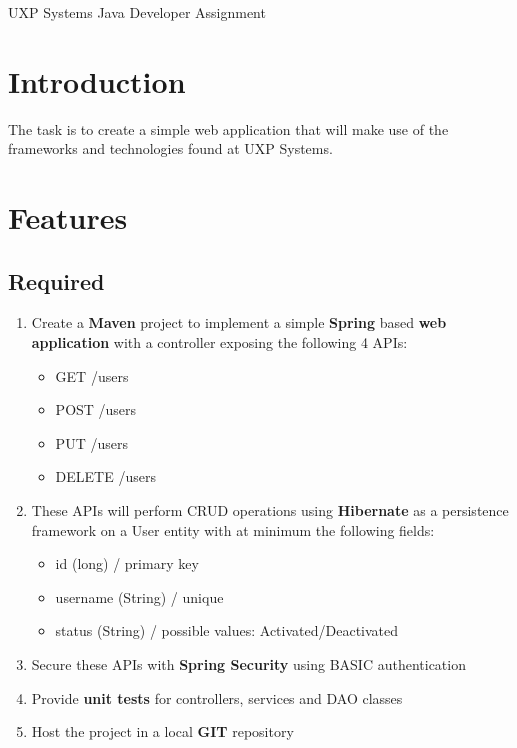 \documentclass[12pt, onecolumn]{article}
\begin{document}
\vspace*{-75px}
\begingroup  
\centering
\LARGE UXP Systems Java Developer Assignment\\[1.5em]
\endgroup
\section{Introduction}
The task is to create a simple web application that will make use of the frameworks and technologies found at UXP Systems.

\section{Features}
\subsection{Required}
\begin{enumerate}
\item Create a \textbf{Maven} project to implement a simple \textbf{Spring} based \textbf{web application} with a controller exposing the following 4 APIs:
\begin{itemize}
	\item GET  /users
	\item POST /users
	\item PUT /users
	\item DELETE /users
\end{itemize}
\item These APIs will perform CRUD operations using \textbf{Hibernate} as a persistence framework on a User entity with at minimum the following fields:
\begin{itemize}
	\item id (long) / primary key
	\item username (String) / unique
	\item status (String)  / possible values: Activated/Deactivated
\end{itemize}
\item Secure these APIs with \textbf{Spring Security} using BASIC authentication
\item Provide \textbf{unit tests} for controllers, services and DAO classes
\item Host the project in a local \textbf{GIT} repository 
\end{enumerate}
\end{document}

